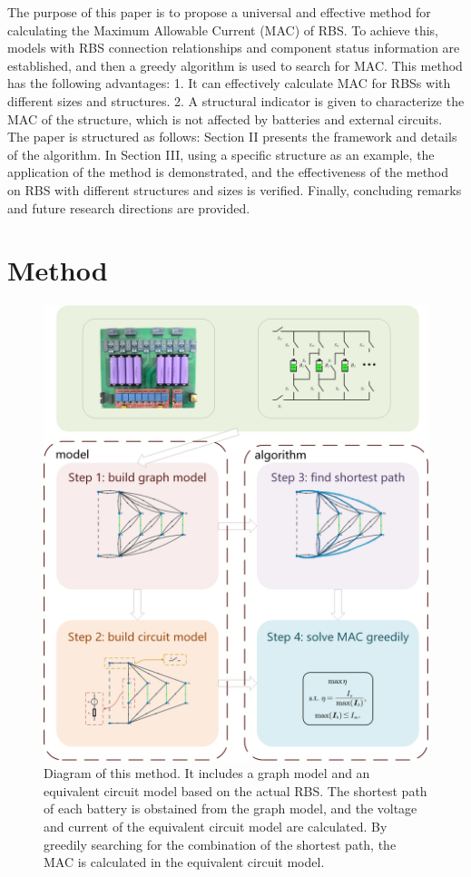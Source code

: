 \documentclass{article}
\begin{document}
The purpose of this paper is to propose a universal and effective method for calculating the Maximum Allowable Current (MAC) of RBS. 
To achieve this, models with RBS connection relationships and component status information are established, and then a greedy algorithm is used to search for MAC. This method has the following advantages:
1. It can effectively calculate MAC for RBSs with different sizes and structures.
2. A structural indicator is given to characterize the MAC of the structure, which is not affected by batteries and external circuits.
The paper is structured as follows: 
Section II presents the framework and details of the algorithm. 
In Section III, using a specific structure as an example, the application of the method is demonstrated, and the effectiveness of the method on RBS with different structures and sizes is verified. 
Finally, concluding remarks and future research directions are provided.

\section{Method}

\begin{figure}
    \centering
    \includegraphics[width=\textwidth]{../attachments/main-v4.png}
    \caption{Diagram of this method. 
        It includes a graph model and an equivalent circuit model based on the actual RBS.
        The shortest path of each battery is obstained from the graph model, and the voltage and current of the equivalent circuit model are calculated.
        By greedily searching for the combination of the shortest path, the MAC is calculated in the equivalent circuit model.
        } 
    \label{fig:main}
\end{figure}
\end{document}
